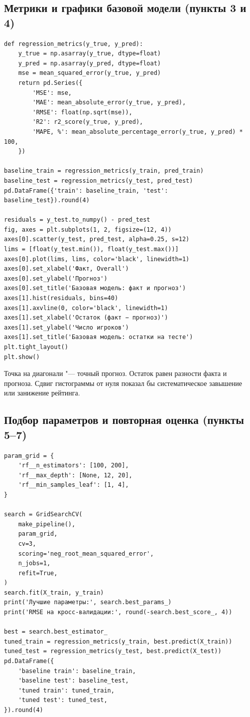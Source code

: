 \documentclass[14pt]{extarticle}
\begin{document}
\subsection{Метрики и графики базовой модели (пункты 3 и 4)}
\begin{verbatim}
def regression_metrics(y_true, y_pred):
    y_true = np.asarray(y_true, dtype=float)
    y_pred = np.asarray(y_pred, dtype=float)
    mse = mean_squared_error(y_true, y_pred)
    return pd.Series({
        'MSE': mse,
        'MAE': mean_absolute_error(y_true, y_pred),
        'RMSE': float(np.sqrt(mse)),
        'R2': r2_score(y_true, y_pred),
        'MAPE, %': mean_absolute_percentage_error(y_true, y_pred) * 100,
    })

baseline_train = regression_metrics(y_train, pred_train)
baseline_test = regression_metrics(y_test, pred_test)
pd.DataFrame({'train': baseline_train, 'test': baseline_test}).round(4)

residuals = y_test.to_numpy() - pred_test
fig, axes = plt.subplots(1, 2, figsize=(12, 4))
axes[0].scatter(y_test, pred_test, alpha=0.25, s=12)
lims = [float(y_test.min()), float(y_test.max())]
axes[0].plot(lims, lims, color='black', linewidth=1)
axes[0].set_xlabel('Факт, Overall')
axes[0].set_ylabel('Прогноз')
axes[0].set_title('Базовая модель: факт и прогноз')
axes[1].hist(residuals, bins=40)
axes[1].axvline(0, color='black', linewidth=1)
axes[1].set_xlabel('Остаток (факт − прогноз)')
axes[1].set_ylabel('Число игроков')
axes[1].set_title('Базовая модель: остатки на тесте')
plt.tight_layout()
plt.show()
\end{verbatim}

Точка на диагонали "--- точный прогноз. Остаток равен разности факта и прогноза. Сдвиг гистограммы от нуля показал бы систематическое завышение или занижение рейтинга.

\subsection{Подбор параметров и повторная оценка (пункты 5--7)}
\begin{verbatim}
param_grid = {
    'rf__n_estimators': [100, 200],
    'rf__max_depth': [None, 12, 20],
    'rf__min_samples_leaf': [1, 4],
}

search = GridSearchCV(
    make_pipeline(),
    param_grid,
    cv=3,
    scoring='neg_root_mean_squared_error',
    n_jobs=1,
    refit=True,
)
search.fit(X_train, y_train)
print('Лучшие параметры:', search.best_params_)
print('RMSE на кросс-валидации:', round(-search.best_score_, 4))

best = search.best_estimator_
tuned_train = regression_metrics(y_train, best.predict(X_train))
tuned_test = regression_metrics(y_test, best.predict(X_test))
pd.DataFrame({
    'baseline train': baseline_train,
    'baseline test': baseline_test,
    'tuned train': tuned_train,
    'tuned test': tuned_test,
}).round(4)
\end{verbatim}
\end{document}
